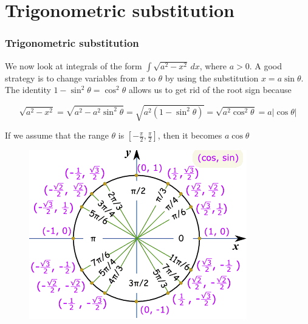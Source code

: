 \documentclass[t]{beamer}
\theoremstyle{plain}
\theoremstyle{definition}
\begin{document}
\section{Trigonometric substitution}


\begin{frame}
\frametitle{Trigonometric substitution}


\noindent We now look at integrals of the form $\int \sqrt{a^{2} - x^{2}}\,dx$, where $a>0$.  A good strategy is to change variables from $x$ to $\theta$ by using the substitution $x = a\sin\theta$.  The identity $1 - \sin^2{\theta} = \cos^2\theta$ allows us to get rid of the root sign because

$$ \sqrt{a^{2} - x^{2}} =  \sqrt{a^{2} - a^{2}\sin^2\theta} = \sqrt{a^2(1 - \sin^2\theta)} = \sqrt{a^2\cos^2\theta} = a |\cos\theta|$$

If we assume that the range $\theta$ is $[-\frac{\pi}{2},\frac{\pi}{2}]$, then it becomes $a \cos\theta$

\begin{figure}[t]
\begin{center}
\includegraphics[scale=0.3]{fig/cos_sin}
\end{center}
\end{figure}

\end{frame}
\end{document}
